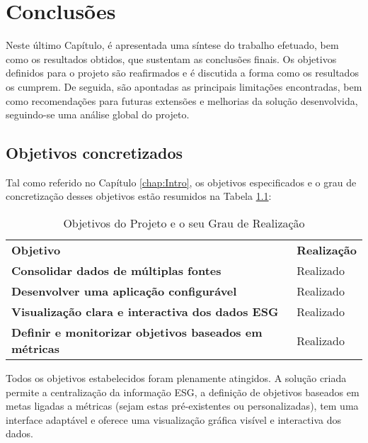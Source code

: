 \chapter{Conclusões} 
\label{chap:Conc}

Neste último Capítulo, é apresentada uma síntese do trabalho efetuado, bem como os resultados obtidos, que sustentam as conclusões finais. Os objetivos definidos para o projeto são reafirmados e é discutida a forma como os resultados os cumprem. De seguida, são apontadas as principais limitações encontradas, bem como recomendações para futuras extensões e melhorias da solução desenvolvida, seguindo-se uma análise global do projeto.

\section{Objetivos concretizados} 
\label{sec:ObjConc}

Tal como referido no Capítulo \ref{chap:Intro}, os objetivos especificados e o grau de concretização desses objetivos estão resumidos na Tabela \ref{tab:objective_done_table}:

\begin{table}[H]
    \renewcommand{\arraystretch}{1.2}
    \setlength{\tabcolsep}{10pt}
    \centering
    \begin{tabular}{>{\bfseries}p{11cm} p{4cm}}
        \rowcolor{purple!40}
        \textbf{Objetivo} & \textbf{Realização} \\
        \textbf{Consolidar dados de múltiplas fontes} & Realizado \\
        \textbf{Desenvolver uma aplicação configurável} & Realizado \\
        \textbf{Visualização clara e interactiva dos dados ESG} & Realizado \\
        \textbf{Definir e monitorizar objetivos baseados em métricas} & Realizado \\
    \end{tabular}
    \caption{Objetivos do Projeto e o seu Grau de Realização}
    \label{tab:objective_done_table}
\end{table}

Todos os objetivos estabelecidos foram plenamente atingidos. A solução criada permite a centralização da informação ESG, a definição de objetivos baseados em metas ligadas a métricas (sejam estas pré-existentes ou personalizadas), tem uma interface adaptável e oferece uma visualização gráfica visível e interactiva dos dados.

